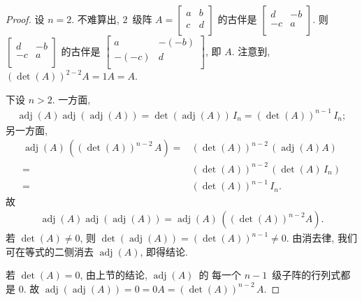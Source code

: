 \begin{proof}
    设 \(n = 2\).
    不难算出, \(2\)~级阵
    \(A =
    \begin{bmatrix}
        a & b \\
        c & d \\
    \end{bmatrix}
    \)
    的古伴是
    \(
    \begin{bmatrix}
        d  & -b \\
        -c & a  \\
    \end{bmatrix}
    \).
    则
    \(
    \begin{bmatrix}
        d  & -b \\
        -c & a  \\
    \end{bmatrix}
    \)
    的古伴是
    \(
    \begin{bmatrix}
        a     & -(-b) \\
        -(-c) & d     \\
    \end{bmatrix}
    \),
    即 \(A\).
    注意到,
    \((\det {(A)})^{2-2} A = 1 A = A\).

    下设 \(n > 2\).
    一方面,
    \begin{align*}
        \operatorname{adj} {(A)}
        \operatorname{adj} {(\operatorname{adj} {(A)})}
        = \det {(\operatorname{adj} {(A)})}\, I_n
        = (\det {(A)})^{n-1}\, I_n;
    \end{align*}
    另一方面,
    \begin{align*}
        \operatorname{adj} {(A)}\,
        ((\det {(A)})^{n-2}\, A)
        = {} &
        (\det {(A)})^{n-2}\,
        (\operatorname{adj} {(A)} A)
        \\
        = {} &
        (\det {(A)})^{n-2}\, (\det {(A)}\,I_n)
        \\
        = {} &
        (\det {(A)})^{n-1}\, I_n.
    \end{align*}
    故
    \begin{align*}
        \operatorname{adj} {(A)}
        \operatorname{adj} {(\operatorname{adj} {(A)})}
        =
        \operatorname{adj} {(A)}\,
        ((\det {(A)})^{n-2} A).
    \end{align*}
    若 \(\det {(A)} \neq 0\),
    则 \(\det {(\operatorname{adj} {(A)})}
    = (\det {(A)})^{n-1} \neq 0\).
    由消去律,
    我们可在等式的二侧消去 \(\operatorname{adj} {(A)}\),
    即得结论.

    若 \(\det {(A)} = 0\),
    由上节的结论, \(\operatorname{adj} {(A)}\)~的%
    每一个 \(n-1\)~级子阵的行列式都是 \(0\).
    故 \(\operatorname{adj} {(\operatorname{adj} {(A)})}
    = 0 = 0A = (\det {(A)})^{n-2}\,A\).
\end{proof}

